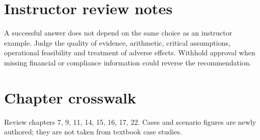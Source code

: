 \documentclass[11pt]{article}
\begin{document}
\section{Instructor review notes}
A successful answer does not depend on the same choice as an instructor example. Judge the quality of evidence, arithmetic, critical assumptions, operational feasibility and treatment of adverse effects. Withhold approval when missing financial or compliance information could reverse the recommendation.
\section{Chapter crosswalk}
Review chapters 7, 9, 11, 14, 15, 16, 17, 22. Cases and scenario figures are newly authored; they are not taken from textbook case studies.
\end{document}
